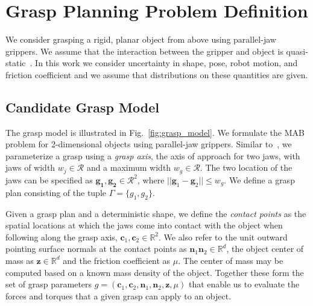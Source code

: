 \documentclass[journal,transmag]{IEEEtran}%
\newcommand{\bc}{\mathbf{c}}
\newcommand{\bn}{\mathbf{n}}
\newcommand{\bz}{\mathbf{z}}
\begin{document}
\section{Grasp Planning Problem Definition}
We consider grasping a rigid, planar object from above using parallel-jaw grippers.
We assume that the interaction between the gripper and object is quasi-static~\cite{kehoe2012estimating, kehoe2012toward}.
In this work we consider uncertainty in shape, pose, robot motion, and friction coefficient and we assume that distributions on these quantities are given.



\subsection{Candidate Grasp Model}
The grasp model is illustrated in Fig.~\ref{fig:grasp_model}. We formulate the MAB problem for 2-dimensional objects using parallel-jaw grippers. Similar to~\cite{mahler2015gp}, we parameterize a grasp using a {\it grasp axis}, the axis of approach for two jaws,  with jaws of width $w_j \in \mathcal{R}$ and a maximum width $w_g \in \mathcal{R}$. The two location of the jaws can be specified as $\mathbf{g_1},\mathbf{g_2} \in \mathcal{R}^2$, where $||\mathbf{g}_1 - \mathbf{g}_2|| \leq w_g$. We define a grasp plan consisting of the tuple $\Gamma = \lbrace g_1, g_2 \rbrace$. 


Given a grasp plan and a deterministic shape, we define the {\it contact points} as the spatial locations at which the jaws come into contact with the object when following along the grasp axis, $\bc_1, \bc_2 \in \mathbb{R}^2$.
We also refer to the unit outward pointing surface normals at the contact points as $\bn_1 \bn_2 \in \mathbb{R}^d$, the object center of mass as $\bz \in \mathbb{R}^d$ and the friction coefficient as $\mu$.
The center of mass may be computed based on a known mass density of the object.
Together these form the set of grasp parameters $g = (\bc_1,\bc_2, \bn_1, \bn_2, \bz,\mu)$ that enable us to evaluate the forces and torques that a given grasp can apply to an object.
\end{document}
